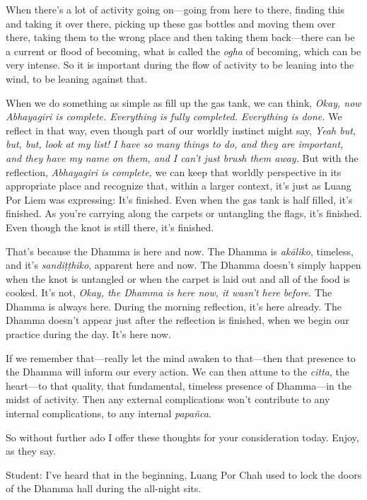When there's a lot of activity going on---going from here to there, 
finding this and taking it over there, picking up these gas bottles and 
moving them over there, taking them to the wrong place and then taking 
them back---there can be a current or flood of becoming, what is called 
the \emph{ogha} of becoming, which can be very intense. So it is 
important during the flow of activity to be leaning into the wind, to 
be leaning against that.

When we do something as simple as fill up the gas tank, we can think, 
\emph{Okay, now Abhayagiri is complete. Everything is fully completed. 
Everything is done.} We reflect in that way, even though part of our 
worldly instinct might say, \emph{Yeah but, but, but, look at my list! 
I have so many things to do, and they are important, and they have my 
name on them, and I can't just brush them away.} But with the 
reflection, \emph{Abhayagiri is complete,} we can keep that worldly 
perspective in its appropriate place and recognize that, within a 
larger context, it's just as Luang Por Liem was expressing: It's 
finished. Even when the gas tank is half filled, it's finished. As 
you're carrying along the carpets or untangling the flags, it's 
finished. Even though the knot is still there, it's finished.

That's because the Dhamma is here and now. The Dhamma is 
\emph{akāliko}, timeless, and it's \emph{sandiṭṭhiko}, apparent 
here and now. The Dhamma doesn't simply happen when the knot is 
untangled or when the carpet is laid out and all of the food is cooked. 
It's not, \emph{Okay, the Dhamma is here now, it wasn't here before.} 
The Dhamma is always here. During the morning reflection, it's here 
already. The Dhamma doesn't appear just after the reflection is 
finished, when we begin our practice during the day. It's here now.

If we remember that---really let the mind awaken to that---then that 
presence to the Dhamma will inform our every action. We can then attune 
to the \emph{citta}, the heart---to that quality, that fundamental, 
timeless presence of Dhamma---in the midst of activity. Then any 
external complications won't contribute to any internal complications, 
to any internal \emph{papañca}.

So without further ado I offer these thoughts for your consideration 
today. Enjoy, as they say.


Student: I've heard that in the beginning, Luang Por Chah used to lock 
the doors of the Dhamma hall during the all-night sits.


